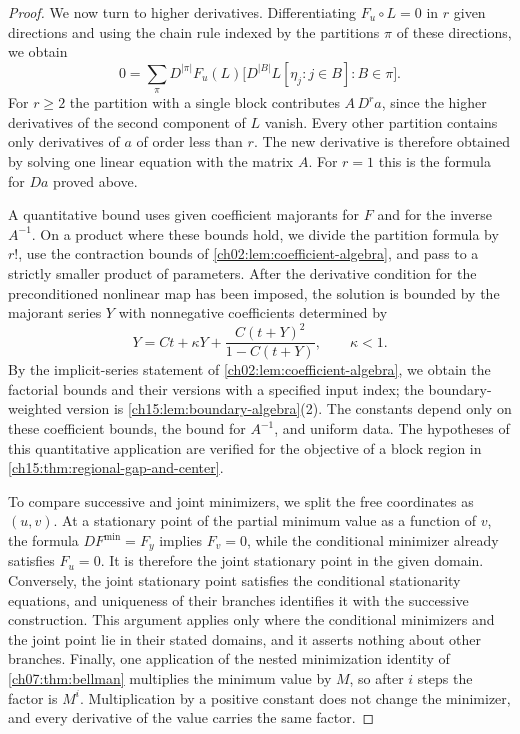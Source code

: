 \begin{proof}
We now turn to higher derivatives. Differentiating $F_u\circ L=0$ in $r$ given directions and using the chain rule indexed by the partitions $\pi$ of these directions, we obtain
\[
 0=\sum_{\pi}
 D^{|\pi|}F_u(L)
       \bigl[D^{|B|}L[\eta_j:j\in B]:B\in\pi\bigr].
\]
For $r\ge2$ the partition with a single block contributes $A\,D^ra$, since the higher derivatives of the second component of $L$ vanish. Every other partition contains only derivatives of $a$ of order less than $r$. The new derivative is therefore obtained by solving one linear equation with the matrix $A$. For $r=1$ this is the formula for $Da$ proved above.

A quantitative bound uses given coefficient majorants for $F$ and for the inverse $A^{-1}$. On a product where these bounds hold, we divide the partition formula by $r!$, use the contraction bounds of \cref{ch02:lem:coefficient-algebra}, and pass to a strictly smaller product of parameters. After the derivative condition for the preconditioned nonlinear map has been imposed, the solution is bounded by the majorant series $Y$ with nonnegative coefficients determined by
\[
 Y=Ct+\kappa Y+\frac{C(t+Y)^2}{1-C(t+Y)},\qquad \kappa<1 .
\]
By the implicit-series statement of \cref{ch02:lem:coefficient-algebra}, we obtain the factorial bounds and their versions with a specified input index; the boundary-weighted version is \cref{ch15:lem:boundary-algebra}(2). The constants depend only on these coefficient bounds, the bound for $A^{-1}$, and uniform data. The hypotheses of this quantitative application are verified for the objective of a block region in \cref{ch15:thm:regional-gap-and-center}.

To compare successive and joint minimizers, we split the free coordinates as $(u,v)$. At a stationary point of the partial minimum value as a function of $v$, the formula $DF^{\min}=F_y$ implies $F_v=0$, while the conditional minimizer already satisfies $F_u=0$. It is therefore the joint stationary point in the given domain. Conversely, the joint stationary point satisfies the conditional stationarity equations, and uniqueness of their branches identifies it with the successive construction. This argument applies only where the conditional minimizers and the joint point lie in their stated domains, and it asserts nothing about other branches. Finally, one application of the nested minimization identity of \cref{ch07:thm:bellman} multiplies the minimum value by $M$, so after $i$ steps the factor is $M^i$. Multiplication by a positive constant does not change the minimizer, and every derivative of the value carries the same factor.
\end{proof}

